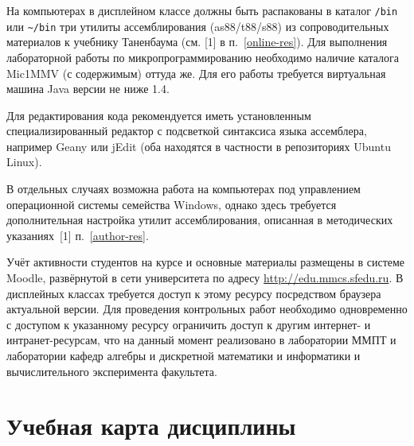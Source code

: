 На компьютерах в дисплейном классе должны быть распакованы в каталог \texttt{/bin} или \texttt{\textasciitilde/bin} три утилиты ассемблирования (as88/t88/s88) из сопроводительных материалов к учебнику Таненбаума (см. [1] в п.~\ref{online-res}). Для выполнения лабораторной работы по микропрограммированию необходимо наличие каталога Mic1MMV (с содержимым) оттуда же. Для его работы требуется виртуальная машина Java версии не ниже 1.4.

Для редактирования кода рекомендуется иметь установленным специализированный редактор с подсветкой синтаксиса языка ассемблера, например Geany или jEdit (оба находятся в частности в репозиториях Ubuntu Linux).

В отдельных случаях возможна работа на компьютерах под управлением операционной системы семейства Windows, однако здесь требуется дополнительная настройка утилит ассемблирования, описанная в методических указаниях~[1] п.~\ref{author-res}.



Учёт активности студентов на курсе и основные материалы размещены в системе Moodle, развёрнутой в сети университета по адресу \url{http://edu.mmcs.sfedu.ru}. В дисплейных классах требуется доступ к этому ресурсу посредством браузера актуальной версии. Для проведения контрольных работ необходимо одновременно с доступом к указанному ресурсу ограничить доступ к другим интернет- и интранет-ресурсам, что на данный момент реализовано в лаборатории ММПТ и лаборатории кафедр алгебры и дискретной математики и информатики и вычислительного эксперимента факультета.

\clearpage
\section{Учебная карта дисциплины}




